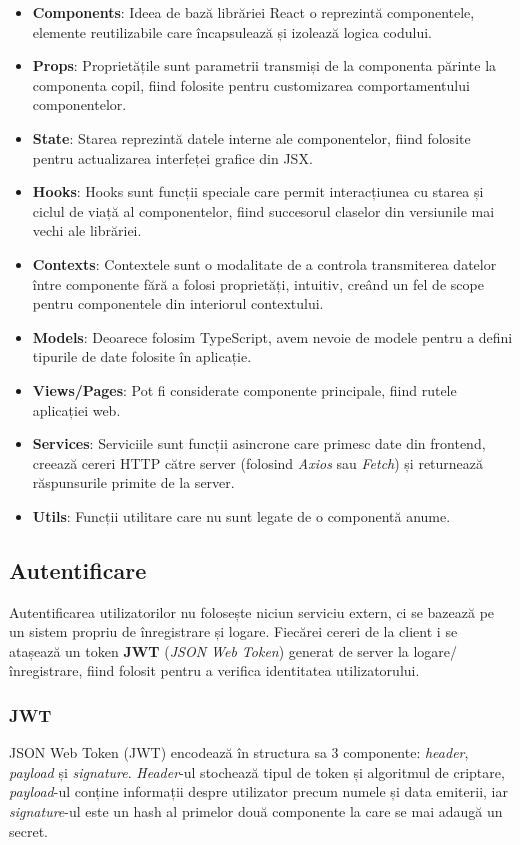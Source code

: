 \begin{itemize}
    \item \textbf{Components}: Ideea de bază librăriei React o reprezintă componentele, elemente
    reutilizabile care încapsulează și izolează logica codului.
    \item \textbf{Props}: Proprietățile sunt parametrii transmiși de la componenta părinte
    la componenta copil, fiind folosite pentru customizarea comportamentului componentelor.
    \item \textbf{State}: Starea reprezintă datele interne ale componentelor, fiind folosite pentru
    actualizarea interfeței grafice din JSX.
    \item \textbf{Hooks}: Hooks sunt funcții speciale care permit interacțiunea cu starea și ciclul
    de viață al componentelor, fiind succesorul claselor din versiunile mai vechi ale librăriei.
    \item \textbf{Contexts}: Contextele sunt o modalitate de a controla transmiterea datelor între
    componente fără a folosi proprietăți, intuitiv, creând un fel de scope pentru componentele din
    interiorul contextului.
    \item \textbf{Models}: Deoarece folosim TypeScript, avem nevoie de modele pentru a defini tipurile
    de date folosite în aplicație.
    \item \textbf{Views/Pages}: Pot fi considerate componente principale, fiind rutele aplicației web.
    \item \textbf{Services}: Serviciile sunt funcții asincrone care primesc date din frontend,
    creează cereri HTTP către server (folosind \textit{Axios} sau \textit{Fetch}) și returnează
    răspunsurile primite de la server.
    \item \textbf{Utils}: Funcții utilitare care nu sunt legate de o componentă anume.
\end{itemize}

\subsection{Autentificare}
Autentificarea utilizatorilor nu folosește niciun serviciu extern, ci se bazează pe un sistem
propriu de înregistrare și logare. Fiecărei cereri de la client i se atașează un token \textbf{JWT}
(\textit{JSON Web Token}) generat de server la logare/înregistrare, fiind folosit pentru a verifica
identitatea utilizatorului. 

\subsubsection{JWT}
JSON Web Token (JWT) encodează în structura sa 3 componente: \textit{header}, \textit{payload} și \textit{signature}.
\textit{Header}-ul stochează tipul de token și algoritmul de criptare, \textit{payload}-ul conține informații
despre utilizator precum numele și data emiterii, iar \textit{signature}-ul este un hash al primelor
două componente la care se mai adaugă un secret.

